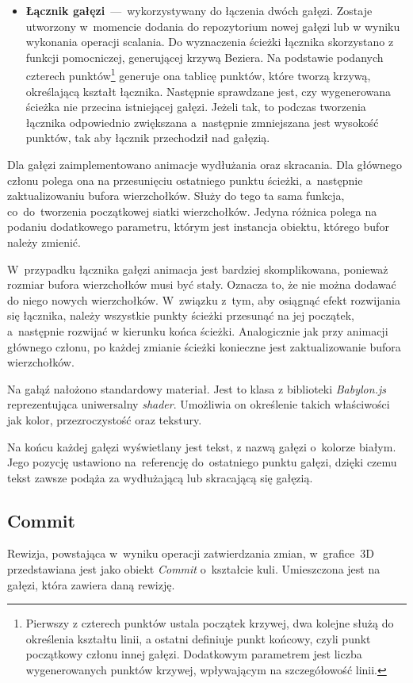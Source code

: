 \documentclass[12pt,a4paper,polish,thesis]{dcsbook}
\begin{document}
{\begin{itemize}
		\item \textbf{Łącznik gałęzi}~---~wykorzystywany do łączenia dwóch gałęzi. Zostaje utworzony w~momencie dodania do repozytorium nowej gałęzi lub w wyniku wykonania operacji scalania. Do wyznaczenia ścieżki łącznika skorzystano z funkcji pomocniczej, generującej krzywą Beziera. Na podstawie podanych czterech punktów\footnote{Pierwszy z czterech punktów ustala początek krzywej, dwa kolejne służą do określenia kształtu linii, a ostatni definiuje punkt końcowy, czyli punkt początkowy członu innej gałęzi. Dodatkowym parametrem jest liczba wygenerowanych punktów krzywej, wpływającym na szczegółowość linii.} generuje ona tablicę punktów, które tworzą krzywą, określającą kształt łącznika. Następnie sprawdzane jest, czy wygenerowana ścieżka nie przecina istniejącej gałęzi. Jeżeli tak, to podczas tworzenia łącznika odpowiednio zwiększana a~następnie zmniejszana jest wysokość punktów, tak aby łącznik przechodził nad gałęzią.
		
	\end{itemize}

	Dla gałęzi zaimplementowano animacje wydłużania oraz skracania. Dla głównego członu polega ona na przesunięciu ostatniego punktu ścieżki, a~następnie zaktualizowaniu bufora wierzchołków. Służy do tego ta sama funkcja, co~do~tworzenia początkowej siatki wierzchołków. Jedyna różnica polega na podaniu dodatkowego parametru, którym jest instancja obiektu, którego bufor należy zmienić. 
	
	W~przypadku łącznika gałęzi animacja jest bardziej skomplikowana, ponieważ rozmiar bufora wierzchołków musi być stały. Oznacza to, że nie można dodawać do niego nowych wierzchołków. W~związku z~tym, aby osiągnąć efekt rozwijania się łącznika, należy wszystkie punkty ścieżki przesunąć na jej początek, a~następnie rozwijać w kierunku końca ścieżki. Analogicznie jak przy animacji głównego członu, po każdej zmianie ścieżki konieczne jest zaktualizowanie bufora wierzchołków.

	Na gałąź nałożono standardowy materiał. Jest to klasa z biblioteki \textit{Babylon.js} reprezentująca uniwersalny \textit{shader}.  Umożliwia on określenie takich właściwości jak kolor, przezroczystość oraz tekstury.

	Na końcu każdej gałęzi wyświetlany jest tekst, z nazwą gałęzi o~kolorze białym. Jego pozycję ustawiono na~referencję do~ostatniego punktu gałęzi, dzięki czemu tekst zawsze podąża za wydłużającą lub skracającą się gałęzią.


	\subsection{Commit}
	Rewizja, powstająca w~wyniku operacji zatwierdzania zmian, w~grafice~3D przedstawiana jest jako obiekt \textit{Commit} o~kształcie kuli. Umieszczona jest na gałęzi, która zawiera daną rewizję.

}
\end{document}
